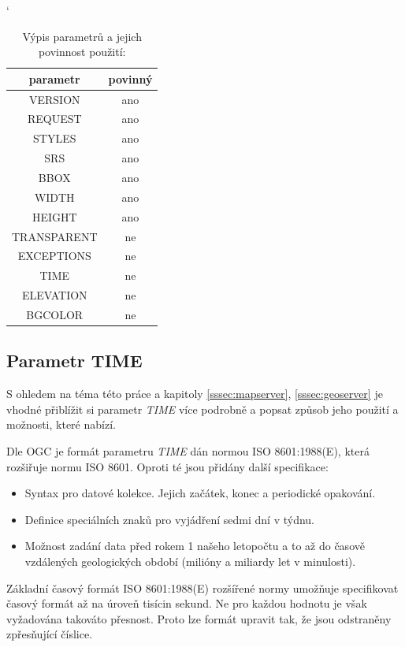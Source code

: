 \bigskip
\begin{table}[h!]
	\catcode`
	\centering
	\begin{tabular}{|c|c|}
		\hline
		parametr & povinný \\ \hline
		\hline
		VERSION & ano \\ \hline
		REQUEST & ano \\ \hline
		STYLES & ano \\ \hline
		SRS & ano \\ \hline
		BBOX & ano \\ \hline
		WIDTH & ano \\ \hline
		HEIGHT & ano \\ \hline
		TRANSPARENT & ne \\ \hline
		EXCEPTIONS & ne \\ \hline
		TIME & ne \\ \hline
		ELEVATION & ne \\ \hline
		BGCOLOR & ne \\ \hline
\end{tabular}
	\caption{Výpis parametrů a jejich povinnost použití: \cite{oqc_wms}}
	\label{tab:WPS_ExecuteRequest}
\end{table}

\subsection{Parametr TIME}
\label{sssec:time}

S ohledem na téma této práce a kapitoly \ref{sssec:mapserver}, \ref{sssec:geoserver} je vhodné přiblížit si parametr
\textit{TIME} více podrobně a popsat způsob jeho použití a možnosti,
které nabízí.

Dle OGC je formát parametru \textit{TIME} dán normou ISO 8601:1988(E),
která rozšiřuje normu ISO 8601. Oproti té jsou přidány další
specifikace\cite{oqc_wms}:
\begin{itemize}
\item Syntax pro datové kolekce. Jejich začátek, konec a periodické
  opakování.
\item Definice speciálních znaků pro vyjádření sedmi dní v týdnu.
\item Možnost zadání data před rokem 1 našeho letopočtu a to až do
  časově vzdálených geologických období (milióny a miliardy let v
  minulosti).
\end{itemize}

Základní časový formát ISO 8601:1988(E) rozšířené normy umožňuje
specifikovat časový formát až na úroveň tisícin sekund. Ne pro každou
hodnotu je však vyžadována takováto přesnost. Proto lze formát upravit
tak, že jsou odstraněny zpřesňující číslice.

